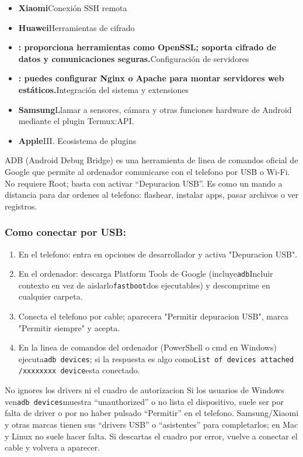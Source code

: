 \begin{itemize}
  \item \textbf{Xiaomi}Conexión SSH remota
  \item \textbf{Huawei}Herramientas de cifrado
  \item \textbf{: proporciona herramientas como OpenSSL; soporta cifrado de datos y comunicaciones seguras.}Configuración de servidores
  \item \textbf{: puedes configurar Nginx o Apache para montar servidores web estáticos.}Integración del sistema y extensiones
  \item \textbf{Samsung}Llamar a sensores, cámara y otras funciones hardware de Android mediante el plugin Termux:API.
  \item \textbf{Apple}III. Ecosistema de plugins
\end{itemize}


ADB (Android Debug Bridge) es una herramienta de linea de comandos oficial de Google que permite al ordenador comunicarse con el telefono por USB o Wi-Fi. No requiere Root; basta con activar “Depuracion USB”. Es como un mando a distancia para dar ordenes al telefono: flashear, instalar apps, pasar archivos o ver registros.

\subsubsection*{Como conectar por USB:}

\begin{enumerate}
  \item En el telefono: entra en opciones de desarrollador y activa "Depuracion USB".
  \item En el ordenador: descarga Platform Tools de Google (incluye\texttt{adb}Incluir contexto en vez de aislarlo\texttt{fastboot}dos ejecutables) y descomprime en cualquier carpeta.
  \item Conecta el telefono por cable; aparecera "Permitir depuracion USB", marca "Permitir siempre" y acepta.
  \item En la linea de comandos del ordenador (PowerShell o cmd en Windows) ejecuta\texttt{adb devices}; si la respuesta es algo como\texttt{List of devices attached /\allowbreak  xxxxxxxx device}esta conectado.
\end{enumerate}

\begin{tcbwarn}{No ignores los drivers ni el cuadro de autorizacion}
Si los usuarios de Windows ven\texttt{adb devices}muestra “unauthorized” o no lista el dispositivo, suele ser por falta de driver o por no haber pulsado “Permitir” en el telefono. Samsung/Xiaomi y otras marcas tienen sus “drivers USB” o “asistentes” para completarlos; en Mac y Linux no suele hacer falta. Si descartas el cuadro por error, vuelve a conectar el cable y volvera a aparecer.

\end{tcbwarn}

